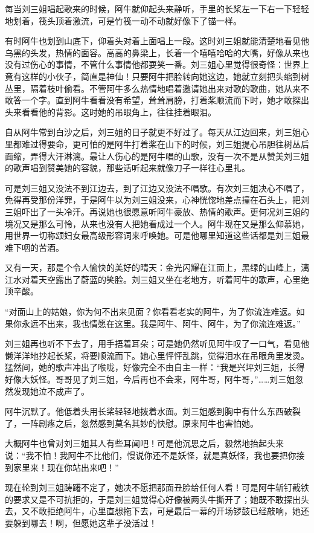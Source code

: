  每当刘三姐唱起歌来的时候，阿牛就仰起头来静听，手里的长桨左一下右一下轻轻地划着，筏头顶着激流，可是竹筏一动不动就好像下了锚一样。 
 
 有时阿牛也划到山底下，仰着头对着上面唱上一段。这时刘三姐就能清楚地看见他乌黑的头发，热情的面容。高高的鼻梁上，长着一个嘻嘻哈哈的大嘴，好像从来也没有过伤心的事情，不管什么事情他都耍笑一番。刘三姐心里觉得很奇怪：世界上竟有这样的小伙子，简直是神仙！只要阿牛把脸转向她这边，她就立刻把头缩到树丛里，隔着枝叶偷看。不管阿牛多么热情地唱着邀请她出来对歌的歌曲，她从来不敢答一个字。直到阿牛看看没有希望，耸耸肩膀，打着桨顺流而下时，她才敢探出头来看看他的背影。这时她的吊眼角上，往往挂着眼泪。 
 
 自从阿牛常到白沙之后，刘三姐的日子就更不好过了。每天从江边回来，刘三姐心里都难过得要命，更可怕的是阿牛打着桨在山下的时候，刘三姐提心吊胆往树丛后面缩，弄得大汗淋漓。最让人伤心的是阿牛唱的山歌，没有一次不是从赞美刘三姐的歌声唱到赞美她的容貌，那些话听起来就像刀子一样往心里扎。 
 
 可是刘三姐又没法不到江边去，到了江边又没法不唱歌。有次刘三姐决心不唱了，免得再受那份洋罪，于是阿牛以为刘三姐没来，心神恍惚地差点撞在石头上，把刘三姐吓出了一头冷汗。再说她也很愿意听阿牛豪放、热情的歌声。更何况刘三姐的境况又是那么可怜，从来也没有人把她看成过一个人。阿牛现在又是那么仰慕她，用世界一切称颂妇女最高级形容词来呼唤她。可是他哪里知道这些话都是刘三姐最难下咽的苦酒。 
 
 又有一天，那是个令人愉快的美好的晴天：金光闪耀在江面上，黑绿的山峰上，漓江水对着天空露出了蔚蓝的笑脸。刘三姐又坐在老地方，听着阿牛的歌声，心里绝顶辛酸。 
 
 “对面山上的姑娘，你为何不出来见面？你看看老实的阿牛，为了你流连难返。如果你永远不出来，我也情愿在这里。我是阿牛、阿牛、阿牛，为了你流连难返。” 
 
 刘三姐再也听不下去了，用手捂着耳朵；可是她仍然听见阿牛叹了一口气，看见他懒洋洋地抄起长桨，将要顺流而下。她心里怦怦乱跳，觉得泪水在吊眼角里发烫。猛然间，她的歌声冲出了喉咙，好像完全不由自主一样：“我是兴坪刘三姐，长得好像大妖怪。哥哥见了刘三姐，今后再也不会来，阿牛哥，阿牛哥，”……刘三姐忽然发现她泣不成声了。 
 
 阿牛沉默了。他低着头用长桨轻轻地拨着水面。刘三姐感到胸中有什么东西破裂了，一阵剧疼之后，忽然感到莫名其妙的快慰。原来阿牛也害怕她。 
 
 大概阿牛也曾对刘三姐其人有些耳闻吧！可是他沉思之后，毅然地抬起头来说：“我不怕！我阿牛不比他们，慢说你还不是妖怪，就是真妖怪，我也要把你接到家里来！现在你站出来吧！” 
 
 现在轮到刘三姐踌躇不定了，她决不愿把那面丑脸给任何人看！可是阿牛斩钉截铁的要求又是不可抗拒的，于是刘三姐觉得心好像被两头牛撕开了；她既不敢探出头去，又不敢拒绝阿牛，心里直想拖下去，可是最后一幕的开场锣鼓已经敲响，她还要躲到哪去！啊，但愿她这辈子没活过！ 
 
